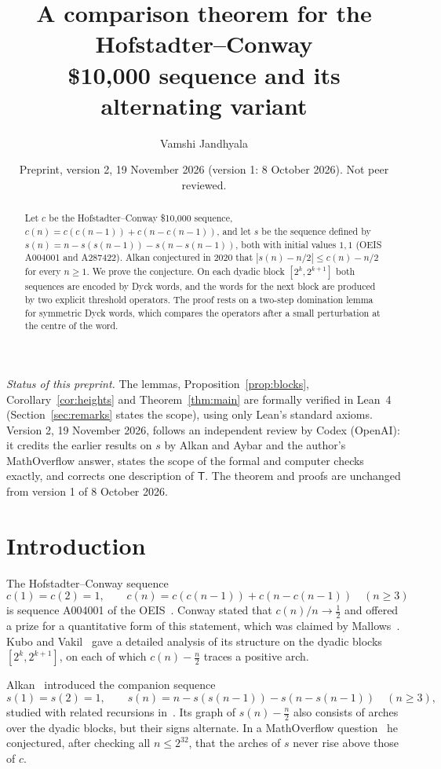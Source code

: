 \documentclass[11pt]{amsart}
\title[The Hofstadter--Conway sequence and its alternating variant]{A comparison theorem for the Hofstadter--Conway\\ \$10{,}000 sequence and its alternating variant}
\author{Vamshi Jandhyala}
\date{Preprint, version 2, 19 November 2026 (version 1: 8 October 2026). Not peer reviewed.}
\theoremstyle{definition}
\theoremstyle{remark}
\numberwithin{equation}{section}
\newcommand{\cT}{\mathsf T}
\begin{document}
\begin{abstract}
Let $c$ be the Hofstadter--Conway \$10{,}000 sequence, $c(n)=c(c(n-1))+c(n-c(n-1))$, and let $s$ be the sequence defined by $s(n)=n-s(s(n-1))-s(n-s(n-1))$, both with initial values $1,1$ (OEIS A004001 and A287422). Alkan conjectured in 2020 that $|s(n)-n/2|\le c(n)-n/2$ for every $n\ge1$. We prove the conjecture. On each dyadic block $[2^k,2^{k+1}]$ both sequences are encoded by Dyck words, and the words for the next block are produced by two explicit threshold operators. The proof rests on a two-step domination lemma for symmetric Dyck words, which compares the operators after a small perturbation at the centre of the word.
\end{abstract}

\maketitle

\noindent\emph{Status of this preprint.} The lemmas, Proposition~\ref{prop:blocks}, Corollary~\ref{cor:heights} and Theorem~\ref{thm:main} are formally verified in Lean~4 (Section~\ref{sec:remarks} states the scope), using only Lean's standard axioms. Version 2, 19 November 2026, follows an independent review by Codex (OpenAI): it credits the earlier results on $s$ by Alkan and Aybar and the author's MathOverflow answer, states the scope of the formal and computer checks exactly, and corrects one description of $\cT$. The theorem and proofs are unchanged from version 1 of 8 October 2026.

\section{Introduction}

The Hofstadter--Conway sequence
\[
c(1)=c(2)=1,\qquad c(n)=c(c(n-1))+c(n-c(n-1))\quad(n\ge3)
\]
is sequence A004001 of the OEIS~\cite{A004001}. Conway stated that $c(n)/n\to\frac12$ and offered a prize for a quantitative form of this statement, which was claimed by Mallows~\cite{Mallows}. Kubo and Vakil~\cite{KV} gave a detailed analysis of its structure on the dyadic blocks $[2^k,2^{k+1}]$, on each of which $c(n)-\frac n2$ traces a positive arch.

Alkan~\cite{A287422} introduced the companion sequence
\[
s(1)=s(2)=1,\qquad s(n)=n-s(s(n-1))-s(n-s(n-1))\quad(n\ge3),
\]
studied with related recursions in~\cite{AA}. Its graph of $s(n)-\frac n2$ also consists of arches over the dyadic blocks, but their signs alternate. In a MathOverflow question~\cite{MO} he conjectured, after checking all $n\le2^{32}$, that the arches of $s$ never rise above those of $c$.
\end{document}
